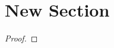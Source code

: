 \begin{problem}
    \lipsum[1]
\end{problem}
\begin{solution}
    \lipsum[1]
\end{solution}

\section{New Section}
\begin{theorem}
    \lipsum[1]
\end{theorem}
\begin{proof}
    \lipsum[1]
\end{proof}

\begin{definition}
    \lipsum[1]
\end{definition}

\begin{note}
    \lipsum[1]
\end{note}

\begin{example}
    \lipsum[1]
\end{example}
\begin{solution}
    \lipsum[1]
\end{solution}

\begin{problem}
    \lipsum[1]
\end{problem}
\begin{solution}
    \lipsum[1]
\end{solution}
